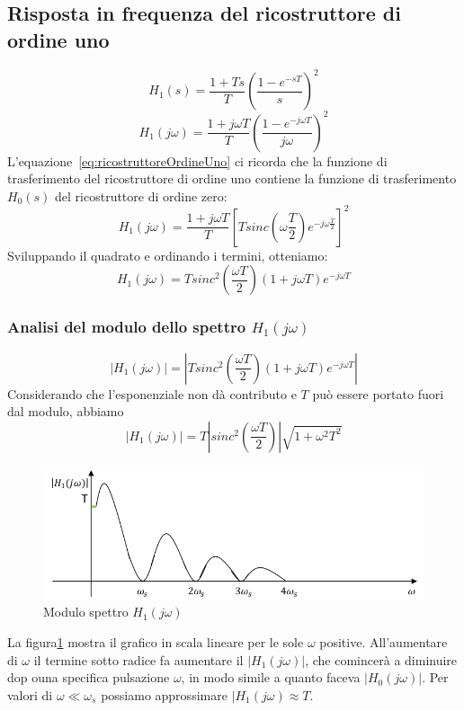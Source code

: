 \documentclass[a4paper]{report}
\begin{document}
\subsection{Risposta in frequenza del ricostruttore di ordine uno}
\[
H_1(s) = \dfrac{1 + Ts}{T} \left( \dfrac{1 - e^{-sT}}{s}\right)^2
\]
\[
H_1(j \omega) = \dfrac{1 + j \omega T}{T} \left( \dfrac{1 - e^{-j
    \omega T}}{j \omega}\right)^2
\]
L'equazione~\ref{eq:ricostruttoreOrdineUno} ci ricorda che la funzione
di trasferimento del ricostruttore di ordine uno contiene la funzione
di trasferimento $H_0(s)$ del ricostruttore di ordine zero:
\[
H_1(j \omega) = \dfrac{1 + j \omega T}{T} \left[ T sinc\left( \omega
  \frac{T}{2}\right) e^{-j \omega \frac{T}{2}}\right]^2
\]
Sviluppando il quadrato e ordinando i termini, otteniamo:
\[
H_1(j \omega) = T sinc^2 \left( \dfrac{\omega T}{2}\right)(1 + j
\omega T)e^{-j \omega T}
\]

\subsubsection{Analisi del modulo dello spettro $H_1(j \omega)$}
\[
|H_1(j \omega)| = \left| T sinc^2 \left( \dfrac{\omega T}{2}\right)(1 + j
\omega T)e^{-j \omega T}\right|
\]
Considerando che l'esponenziale non d\`a contributo e $T$ pu\`o essere
portato fuori dal modulo, abbiamo
\[
|H_1(j \omega)| = T \left|sinc^2 \left( \dfrac{\omega T}{2}\right)\right| \sqrt{1 + \omega^2 T^2}
\]
\begin{figure}[!h]
  \begin{center}
    \includegraphics[scale=0.4]{./figures/ricostruttoreOrdineUnoSpettro00.png}
    \caption{Modulo spettro $H_1(j
      \omega)$}\label{fig:ricostruttoreOrdineUnoSpettro00} 
  \end{center}
\end{figure}
La figura\ref{fig:ricostruttoreOrdineUnoSpettro00} mostra il grafico
in scala lineare per le sole $\omega$ positive. All'aumentare di
$\omega$ il termine sotto radice fa aumentare il $|H_1(j \omega)|$,
che comincer\`a a diminuire dop ouna specifica pulsazione $\omega$, in
modo simile a quanto faceva $|H_0(j \omega)|$. Per valori di $\omega
\ll \omega_s$ possiamo approssimare $|H_1(j \omega) \approx T$.
\end{document}
